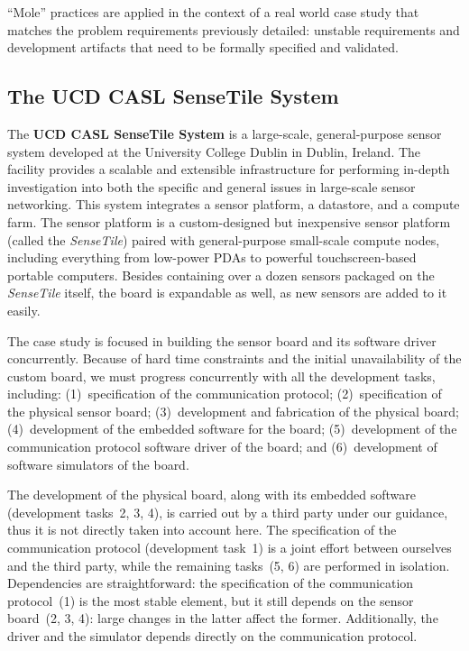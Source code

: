 \documentclass[english]{lni}
\newcommand{\ST}{\emph{SenseTile}\xspace}
\begin{document}
``Mole'' practices are applied in the context of a real world case study that matches the problem requirements previously detailed: unstable requirements and development artifacts that need to be formally specified and validated.  

\subsection{The UCD CASL SenseTile System}
\label{sec:ucd-casl-sensetile}

The \textbf{UCD CASL SenseTile System} is a large-scale, general-purpose sensor system developed at the University College Dublin in Dublin, Ireland.  
The facility provides a scalable and extensible infrastructure for performing in-depth investigation into both the specific and general issues in large-scale sensor networking. 
This system integrates a sensor platform, a datastore, and a compute farm.  
The sensor platform is a custom-designed but inexpensive sensor platform (called the \ST) paired with general-purpose small-scale compute nodes, including everything from low-power PDAs to powerful touchscreen-based portable computers.  
Besides containing over a dozen sensors packaged on the \ST itself, the board is expandable as well, as new sensors are added to it easily.

The case study is focused in building the sensor board and its software driver concurrently.  
Because of hard time constraints and the initial unavailability of the custom board, we must progress concurrently with all the development tasks, including: (1)~specification of the communication protocol; (2)~specification of the physical sensor board; (3)~development and fabrication of the physical board; (4)~development of the embedded software for the board; (5)~development of the communication protocol software driver of the board; and (6)~development of software simulators of the board.

The development of the physical board, along with its embedded software (development tasks~2, 3, 4), is carried out by a third party under our guidance, thus it is not directly taken into account here. 
The specification of the communication protocol (development task~1) is a joint effort between ourselves and the third party, while the remaining tasks~(5, 6) are performed in isolation.  
Dependencies are straightforward: the specification of the communication protocol~(1) is the most stable element, but it still depends on the sensor board~(2, 3, 4): large changes in the latter affect the former.
Additionally, the driver and the simulator depends directly on the communication protocol.
\end{document}
